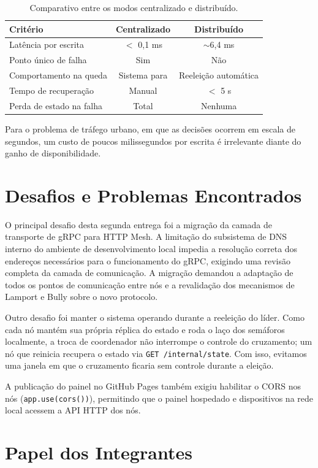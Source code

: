 \documentclass[12pt]{article}
\begin{document}
\begin{table}[ht]
\centering
\caption{Comparativo entre os modos centralizado e distribuído.}
\label{tab:comparativo}
\begin{tabular}{lcc}
\hline
\textbf{Critério} & \textbf{Centralizado} & \textbf{Distribuído} \\
\hline
Latência por escrita & $<$ 0,1 ms & $\sim$6,4 ms \\
Ponto único de falha & Sim & Não \\
Comportamento na queda & Sistema para & Reeleição automática \\
Tempo de recuperação & Manual & $<$ 5 s \\
Perda de estado na falha & Total & Nenhuma \\
\hline
\end{tabular}
\end{table}

Para o problema de tráfego urbano, em que as decisões ocorrem em escala de segundos, um custo de poucos milissegundos por escrita é irrelevante diante do ganho de disponibilidade.

\section{Desafios e Problemas Encontrados}

O principal desafio desta segunda entrega foi a migração da camada de transporte de gRPC para HTTP Mesh. A limitação do subsistema de DNS interno do ambiente de desenvolvimento local impedia a resolução correta dos endereços necessários para o funcionamento do gRPC, exigindo uma revisão completa da camada de comunicação. A migração demandou a adaptação de todos os pontos de comunicação entre nós e a revalidação dos mecanismos de Lamport e Bully sobre o novo protocolo.

Outro desafio foi manter o sistema operando durante a reeleição do líder. Como cada nó mantém sua própria réplica do estado e roda o laço dos semáforos localmente, a troca de coordenador não interrompe o controle do cruzamento; um nó que reinicia recupera o estado via \texttt{GET /internal/state}. Com isso, evitamos uma janela em que o cruzamento ficaria sem controle durante a eleição.

A publicação do painel no GitHub Pages também exigiu habilitar o CORS nos nós (\texttt{app.use(cors())}), permitindo que o painel hospedado e dispositivos na rede local acessem a API HTTP dos nós.

\section{Papel dos Integrantes}
\end{document}
